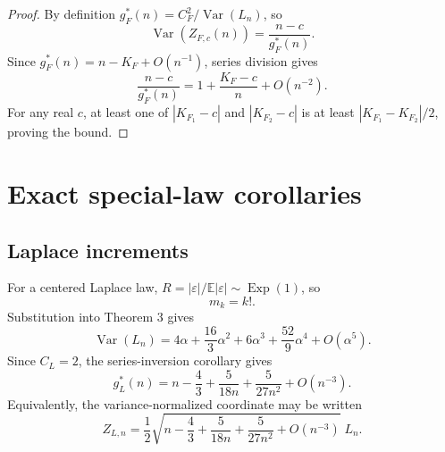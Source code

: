\documentclass[11pt]{article}
\newcommand{\E}{\mathbb E}
\newcommand{\Var}{\operatorname{Var}}
\begin{document}
\begin{proof}
By definition $g_F^*(n)=C_F^2/\Var(L_n)$, so
\begin{equation}
\Var(Z_{F,c}(n))=\frac{n-c}{g_F^*(n)}.
\end{equation}
Since $g_F^*(n)=n-K_F+O(n^{-1})$, series division gives
\begin{equation}
\frac{n-c}{g_F^*(n)}=1+\frac{K_F-c}{n}+O(n^{-2}).
\end{equation}
For any real $c$, at least one of $|K_{F_1}-c|$ and $|K_{F_2}-c|$ is at least $|K_{F_1}-K_{F_2}|/2$, proving the bound.
\end{proof}

\section{Exact special-law corollaries}
\subsection{Laplace increments}
For a centered Laplace law, $R=|\varepsilon|/\E|\varepsilon|\sim\operatorname{Exp}(1)$, so
\begin{equation}
m_k=k!.
\end{equation}
Substitution into Theorem 3 gives
\begin{equation}
\boxed{
\Var(L_n)
=4\alpha+\frac{16}{3}\alpha^2+6\alpha^3+\frac{52}{9}\alpha^4+O(\alpha^5).}
\end{equation}
Since $C_L=2$, the series-inversion corollary gives
\begin{equation}
\boxed{
g_L^*(n)=n-\frac43+\frac{5}{18n}+\frac{5}{27n^2}+O(n^{-3}).}
\end{equation}
Equivalently, the variance-normalized coordinate may be written
\begin{equation}
Z_{L,n}
=\frac12\sqrt{n-\frac43+\frac{5}{18n}+\frac{5}{27n^2}+O(n^{-3})}\;L_n.
\end{equation}
\end{document}
